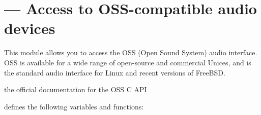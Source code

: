 \section{ ---
         Access to OSS-compatible audio devices}


This module allows you to access the OSS (Open Sound System) audio
interface.  OSS is available for a wide range of open-source and
commercial Unices, and is the standard audio interface for Linux and
recent versions of FreeBSD.

%
%
%
%
%

\begin{seealso}
 {the official
         documentation for the OSS C API}
\end{seealso}

 defines the following variables and functions:

